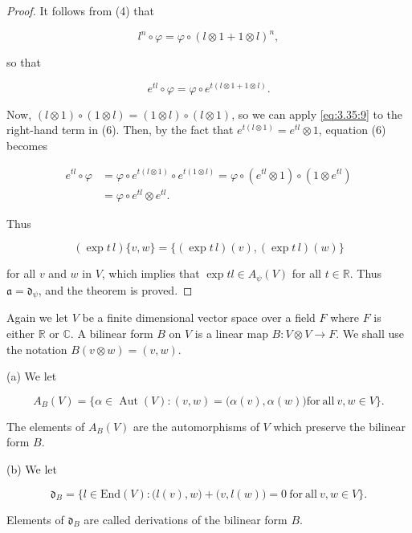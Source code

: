 \begin{proof}
It follows from (4) that

\begin{equation}
\tag{5}\label{eq:3.54:5}
l^{n}\circ\varphi=\varphi\circ(l\otimes1+1\otimes l)^{n},
\end{equation}

so that

\begin{equation}
\tag{6}\label{eq:3.54:6}
e^{tl}\circ\varphi=\varphi\circ e^{t(l\otimes1+1\otimes l)}.
\end{equation}

Now,  $ (l \otimes 1) \circ (1 \otimes l) = (1 \otimes l) \circ (l \otimes 1) $, so we can apply \eqref{eq:3.35:9} to the right-hand term in (6). Then, by the fact that  $ e^{t(l \otimes 1)} = e^{t l} \otimes 1 $, equation (6) becomes

\begin{equation}
\tag{7}\label{eq:3.54:7}
\begin{aligned}e^{tl}\circ\varphi&=\varphi\circ e^{t(l\otimes1)}\circ e^{t(1\otimes l)}=\varphi\circ(e^{tl}\otimes1)\circ(1\otimes e^{tl})\\&=\varphi\circ e^{tl}\otimes e^{tl}.\end{aligned}
\end{equation}

Thus

\[
(\exp t\,l)\{v,w\}=\{(\exp t\,l)(v),(\exp t\,l)(w)\}
\]

for all $v$ and $w$ in $V$, which implies that $\exp t l \in A_{\psi}(V)$ for all $t \in \mathbb{R}$. Thus $\mathfrak{a}=\mathfrak{d}_{\psi}$, and the theorem is proved.

\end{proof}

\begin{definition}\label{thm:3.55}
Again we let $V$ be a finite dimensional vector space over a field $F$ where $F$ is either $\mathbb{R}$ or $\mathbb{C}$. A bilinear form $B$ on $V$ is a linear map $B: V \otimes V \to F$. We shall use the notation $B(v \otimes w) = (v, w)$.

(a) We let

\[
A_{B}(V)=\big\{\alpha\in\operatorname{Aut}(V)\colon(v,w)=\big(\alpha(v),\alpha(w)\big)\mathrm{for~all~}v,w\in V\big\}.
\]

The elements of $A_{B}(V)$ are the automorphisms of $V$ which preserve the bilinear form $B$.

(b) We let

\[
\mathfrak{d}_{B}=\big\{l\in\mathrm{End}(V)\colon\big(l(v),w\big)+\big(v,l(w)\big)=0\mathrm{~for~all~}v,w\in V\big\}.
\]

Elements of  $ \mathfrak{d}_{B} $ are called derivations of the bilinear form $B$.

\end{definition}

